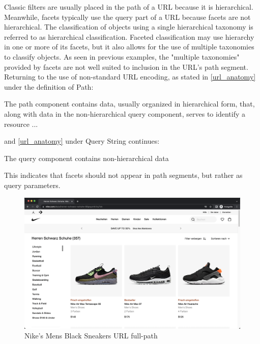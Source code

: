 Classic filters are usually placed in the path of a URL because it is hierarchical. Meanwhile, facets typically use the query part of a URL because facets are not hierarchical. The classification of objects using a single hierarchical taxonomy is referred to as hierarchical classification. Faceted classification may use hierarchy in one or more of its facets, but it also allows for the use of multiple taxonomies to classify objects. As seen in previous examples, the "multiple taxonomies" provided by facets are not well suited to inclusion in the URL's path segment. Returning to the use of non-standard URL encoding, as stated in \autoref{url_anatomy} under the definition of Path:

\begin{displayquote}
  The path component contains data, usually organized in hierarchical form, that, along with data in the non-hierarchical query component, serves to identify a resource ...
\end{displayquote}

\noindent and \autoref{url_anatomy} under Query String continues:

\begin{displayquote}
  The query component contains non-hierarchical data
\end{displayquote}

\noindent This indicates that facets should not appear in path segments, but rather as query parameters.

\begin{figure}[H]
  \includegraphics[width=\textwidth]{assets/screenshot_nike_website.png}
  \caption{Nike's Mens Black Sneakers URL full-path}
  \label{fig:nikeMensBlackSneakersUrl}
\end{figure}

